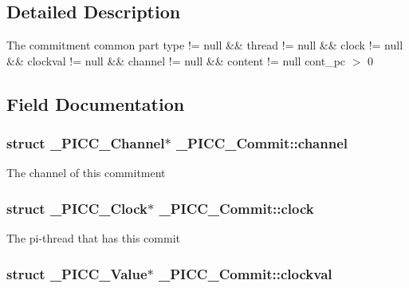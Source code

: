 {\bf }\par



\subsection{Detailed Description}
The commitment common part  type != null \&\& thread != null \&\& clock != null \&\& clockval != null \&\& channel != null \&\& content != null  cont\-\_\-pc $>$ 0 

\subsection{Field Documentation}
\hypertarget{struct__PICC__Commit_af80b43fa7c7a1fee8446a6b2efdaab03}{
\subsubsection[{channel}]{\setlength{\rightskip}{0pt plus 5cm}struct {\bf \-\_\-\-P\-I\-C\-C\-\_\-\-Channel}$\ast$ \-\_\-\-P\-I\-C\-C\-\_\-\-Commit\-::channel}}\label{struct__PICC__Commit_af80b43fa7c7a1fee8446a6b2efdaab03}
The channel of this commitment \hypertarget{struct__PICC__Commit_acf28d34611ca5566a2681238e0d105ea}{
\subsubsection[{clock}]{\setlength{\rightskip}{0pt plus 5cm}struct {\bf \-\_\-\-P\-I\-C\-C\-\_\-\-Clock}$\ast$ \-\_\-\-P\-I\-C\-C\-\_\-\-Commit\-::clock}}\label{struct__PICC__Commit_acf28d34611ca5566a2681238e0d105ea}
The pi-\/thread that has this commit \hypertarget{struct__PICC__Commit_ad26ca86d6ec9cf47f14ce4eac9d2dfaf}{
\subsubsection[{clockval}]{\setlength{\rightskip}{0pt plus 5cm}struct {\bf \-\_\-\-P\-I\-C\-C\-\_\-\-Value}$\ast$ \-\_\-\-P\-I\-C\-C\-\_\-\-Commit\-::clockval}}\label{struct__PICC__Commit_ad26ca86d6ec9cf47f14ce4eac9d2dfaf}
